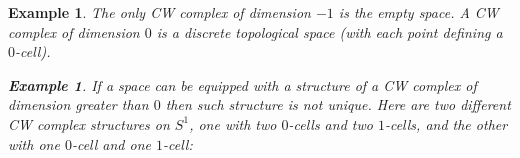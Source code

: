 \documentclass[11pt, letterpaper, oneside]{report}
\theoremstyle{pplain}
\theoremstyle{ddefinition}
\newtheorem{example}[theorem]{Example}
\theoremstyle{nnn}
\theoremstyle{eexercise}
\begin{document}
\begin{example} The only CW complex of dimension $-1$ is the empty space. A CW complex of 
dimension $0$ is a discrete topological space (with each point defining a $0$-cell). 


\begin{example}
If a space can be equipped with a structure of a CW complex of dimension greater than $0$ then such 
structure is not unique. Here  are two different CW complex structures on $S^{1}$, one  with two $0$-cells and 
two $1$-cells, and  the other with one $0$-cell and one $1$-cell:
\end{example}


\end{example}
\end{document}
